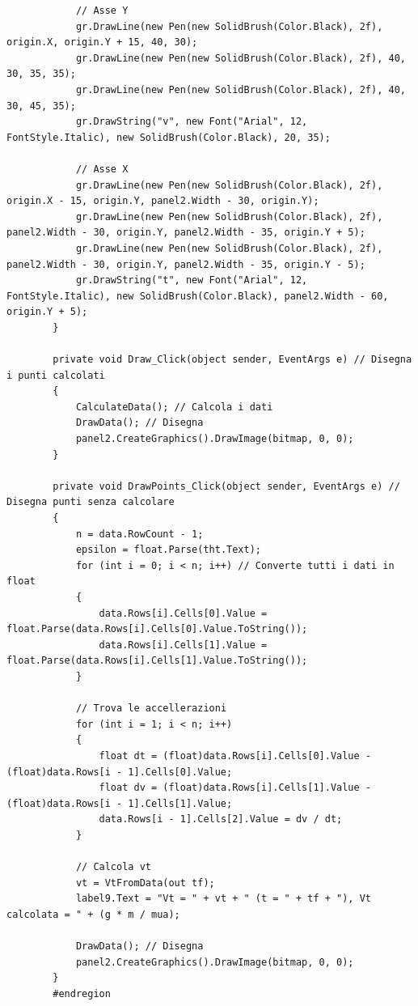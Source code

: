 \documentclass[11pt]{article} %
\begin{document}
\begin{lstlisting}
            // Asse Y
            gr.DrawLine(new Pen(new SolidBrush(Color.Black), 2f), origin.X, origin.Y + 15, 40, 30);
            gr.DrawLine(new Pen(new SolidBrush(Color.Black), 2f), 40, 30, 35, 35);
            gr.DrawLine(new Pen(new SolidBrush(Color.Black), 2f), 40, 30, 45, 35);
            gr.DrawString("v", new Font("Arial", 12, FontStyle.Italic), new SolidBrush(Color.Black), 20, 35);

            // Asse X
            gr.DrawLine(new Pen(new SolidBrush(Color.Black), 2f), origin.X - 15, origin.Y, panel2.Width - 30, origin.Y);
            gr.DrawLine(new Pen(new SolidBrush(Color.Black), 2f), panel2.Width - 30, origin.Y, panel2.Width - 35, origin.Y + 5);
            gr.DrawLine(new Pen(new SolidBrush(Color.Black), 2f), panel2.Width - 30, origin.Y, panel2.Width - 35, origin.Y - 5);
            gr.DrawString("t", new Font("Arial", 12, FontStyle.Italic), new SolidBrush(Color.Black), panel2.Width - 60, origin.Y + 5);
        }

        private void Draw_Click(object sender, EventArgs e) // Disegna i punti calcolati
        {
            CalculateData(); // Calcola i dati
            DrawData(); // Disegna
            panel2.CreateGraphics().DrawImage(bitmap, 0, 0);
        }

        private void DrawPoints_Click(object sender, EventArgs e) // Disegna punti senza calcolare
        {
            n = data.RowCount - 1;
            epsilon = float.Parse(tht.Text);
            for (int i = 0; i < n; i++) // Converte tutti i dati in float
            {
                data.Rows[i].Cells[0].Value = float.Parse(data.Rows[i].Cells[0].Value.ToString());
                data.Rows[i].Cells[1].Value = float.Parse(data.Rows[i].Cells[1].Value.ToString());
            }

            // Trova le accellerazioni
            for (int i = 1; i < n; i++)
            {
                float dt = (float)data.Rows[i].Cells[0].Value - (float)data.Rows[i - 1].Cells[0].Value;
                float dv = (float)data.Rows[i].Cells[1].Value - (float)data.Rows[i - 1].Cells[1].Value;
                data.Rows[i - 1].Cells[2].Value = dv / dt;
            }

            // Calcola vt
            vt = VtFromData(out tf);
            label9.Text = "Vt = " + vt + " (t = " + tf + "), Vt calcolata = " + (g * m / mua);

            DrawData(); // Disegna
            panel2.CreateGraphics().DrawImage(bitmap, 0, 0);
        } 
        #endregion


\end{lstlisting}
\end{document}
